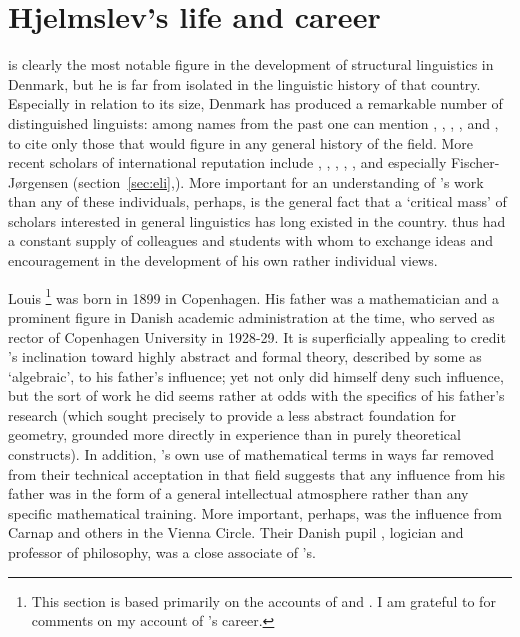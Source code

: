 \section{Hjelmslev's life and career}

{\Hjelmslev} is clearly the most notable figure in the development of structural
linguistics in Denmark, but he is far from isolated in the linguistic
history of that country. Especially in relation to its size, Denmark
has produced a remarkable number of distinguished linguists: among
names from the past one can mention , ,
, , and , 
to cite only those that would figure in
any general history of the field. More recent scholars of
international reputation include , ,
, , , and especially {\Eli}
Fischer-Jørgensen (section~\ref{sec:eli},).  More important for an
understanding of {\Hjelmslev}'s work than any of these individuals,
perhaps, is the general fact that a `critical mass' of scholars
interested in general linguistics has long existed in the
country. {\Hjelmslev} thus had a constant supply of colleagues and
students with whom to exchange ideas and encouragement in the
development of his own rather individual views.


Louis {\Hjelmslev}\footnote{This section is based primarily on the
  accounts of \citet{efj65:hjelmslev.obit,fischer-jorgensen75:trends}
  and \citet{jensen.gregersen21:hjelmslev.jakobson}. I am grateful to
   for comments on my account of {\Hjelmslev}'s career.}
was born in 1899 in Copenhagen. His father was a mathematician and a
prominent figure in {Danish} academic administration at the time, who
served as rector of Copenhagen University in 1928-29. It is
superficially appealing to credit {\Hjelmslev}'s inclination toward
highly abstract and formal theory, described by some as `algebraic',
to his father's influence; yet not only did {\Hjelmslev} himself deny
such influence, but the sort of work he did seems rather at odds with
the specifics of his father's research (which sought precisely to
provide a less abstract foundation for geometry, grounded more
directly in experience than in purely theoretical constructs). In
addition, {\Hjelmslev}'s own use of mathematical terms in ways far
removed from their technical acceptation in that field suggests that
any influence from his father was in the form of a general
intellectual atmosphere rather than any specific mathematical
training. More important, perhaps, was the influence from Carnap and
others in the Vienna Circle. Their {Danish} pupil ,
logician and professor of philosophy, was a close associate of
{\Hjelmslev}'s.

